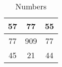 \begin{table}[htbp]
    \centering
    \begin{tabular}{c|c|c}
      57  & 77 & 55 \\
      \hline
      77  & 909 & 77 \\
      \hline
      45 & 21 & 44 \\
    \end{tabular}
    \caption{Numbers}
    \label{tab:num}
\end{table}